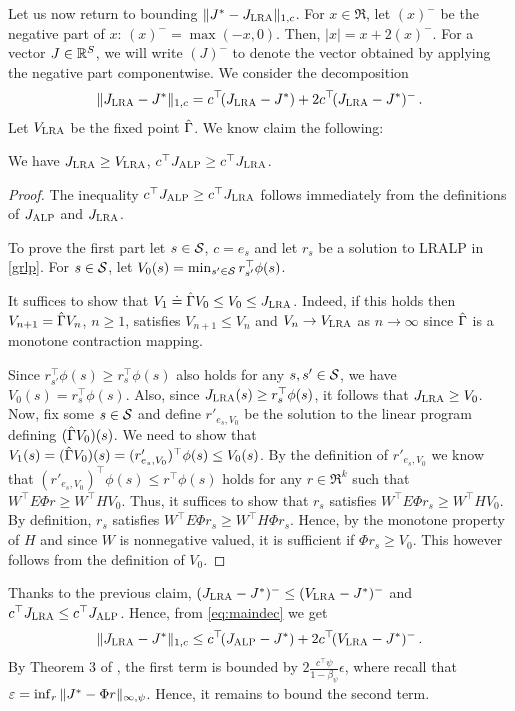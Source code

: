 \documentclass[12pt,draftcls,onecolumn]{IEEEtran}
\begin{document}
Let us now return to bounding $\norm{J^*-\Jlr}_{1,c}$.
For $x\in \Re$, let $(x)^-$ be the negative part of $x$: $(x)^- = \max(-x,0)$. Then, $|x| = x + 2 (x)^-$. For a vector $J\in \R^S$,
we will write $(J)^-$ to denote the vector obtained by applying the negative part componentwise.
We consider the decomposition
\begin{align}
\label{eq:maindec}
\norm{\Jlr-J^*}_{1,c} = c^\top\!( \Jlr - J^* ) + 2c^\top\!( \Jlr - J^* )^-\,.
\end{align}
Let $\hv$ be the fixed point $\hg$. We know claim the following:
\begin{claim}
We have $\Jlr \ge \hv$, $c^\top \Jalp \ge c^\top \Jlr$.
\end{claim}
\begin{proof}
The inequality $c^\top \Jalp \ge c^\top \Jlr$  follows immediately from the definitions of $\Jalp$ and $\Jlr$.

To prove the first part let $s\in \S$,  $c=e_s$ and let $r_s$ be a solution to LRALP in \eqref{grlp}.
For $s\in \S$, let $V_0(s)= \min_{s'\in \S} r_{s'}^\top \phi(s)$.

It suffices to show that $V_1\eqdef \hg V_0 \le V_0 \le \hj$.
Indeed, if this holds then
$V_{n+1} = \hg V_n$, $n\ge 1$, satisfies $V_{n+1}\le V_n$ and $V_n \to \hv$ as $n\to\infty$
since $\hg$ is a monotone contraction mapping.


Since  $r_{s'}^\top \phi(s) \ge r_s^\top \phi(s)$ %
also holds for any $s,s'\in \S$,
we have $V_0(s)  = r_s^\top \phi(s)$. %
Also, since $\hj(s) \ge r_s^\top \phi(s)$, %
it follows that $\hj\geq V_0$.
Now,  fix some $s\in \S$ and
define $r'_{e_s,V_0}$ be the solution to the linear program defining $(\hg V_0)(s)$.
We need to show that $V_1(s)=(\hg V_0)(s) = ( r'_{e_s,V_0})^\top \phi(s) \leq V_0(s)$.
By the definition of $r'_{e_s,V_0}$ we know that $( r'_{e_s,V_0})^\top \phi(s) \le r^\top \phi(s)$ %
holds for any $r\in \Re^k$ such that $W^\top E \Phi r \ge W^\top H V_0$.
Thus, it suffices to show that $r_s$ satisfies $W^\top E \Phi r_s \ge W^\top H V_0$.
By definition, $r_s$ satisfies $W^\top E \Phi r_s \ge W^\top H \Phi r_s$.
Hence, by the monotone property of $H$ and since $W$ is nonnegative valued, %
it is sufficient if $\Phi r_s \ge V_0$.
This however follows from the definition of $V_0$.
\end{proof}
Thanks to the previous claim, $(\Jlr - J^*)^- \le (\hv - J^*)^-$ and $c^\top \Jlr \le c^\top \Jalp$. Hence,
from \eqref{eq:maindec} we get
\begin{align*}
\norm{\Jlr-J^*}_{1,c} \le c^\top\!( \Jalp - J^* ) + 2c^\top\!( \hv - J^* )^-\,.
\end{align*}
By Theorem 3 of \cite{ALP}, the first term is bounded by $2 \frac{c^\top \psi}{1-\beta_\psi} \epsilon$, where
recall that $\epsilon = \inf_{r} \norm{J^* - \Phi r}_{\mn}$. Hence, it remains to bound the second term.
\end{document}
